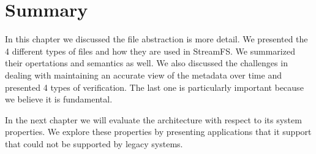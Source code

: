 \section{Summary}

In this chapter we discussed the file abstraction is more detail.  We presented the 4 different types of files and how they
are used in StreamFS.  We summarized their opertations and semantics as well.  We also discussed the challenges in dealing with
maintaining an accurate view of the metadata over time and presented 4 types of verification.
The last one is particularly important because we believe it is fundamental.

In the next chapter we will evaluate the architecture with respect to its system properties.  We explore these properties by
presenting applications that it support that could not be supported by legacy systems.

